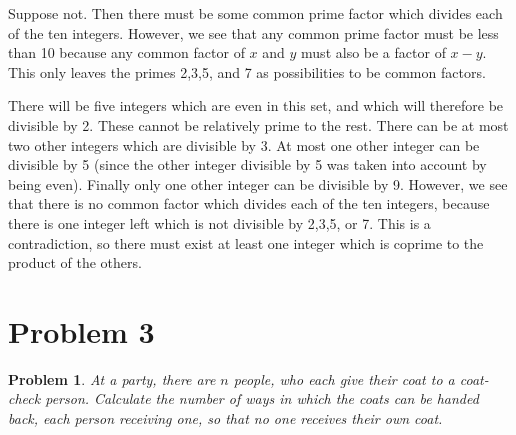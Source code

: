 \documentclass[psamsfonts]{amsart}
\newtheorem{prob}{Problem}[section]
\newenvironment{sol}{{\bfseries Solution}}{\qedsymbol}
\theoremstyle{definition}
\theoremstyle{remark}
\numberwithin{equation}{section}
\begin{document}
\begin{sol}
Suppose not. Then there must be some common prime factor which divides each of the ten integers. However, we see that any common prime factor must be less than 10 because any common factor of $x$ and $y$ must also be a factor of $x - y$. This only leaves the primes 2,3,5, and 7 as possibilities to be common factors.

There will be five integers which are even in this set, and which will therefore be divisible by 2. These cannot be relatively prime to the rest. There can be at most two other integers which are divisible by 3. At most one other integer can be divisible by 5 (since the other integer divisible by 5 was taken into account by being even). Finally only one other integer can be divisible by 9. However, we see that there is no common factor which divides each of the ten integers, because there is one integer left which is not divisible by 2,3,5, or 7. This is a contradiction, so there must exist at least one integer which is coprime to the product of the others.
\end{sol}

\section{Problem 3}

\begin{prob}
At a party, there are $n$ people, who each give their coat to a coat-check person. Calculate the number of ways in which the coats can be handed back, each person receiving one, so that no one receives their own coat. 
\end{prob}
\end{document}
